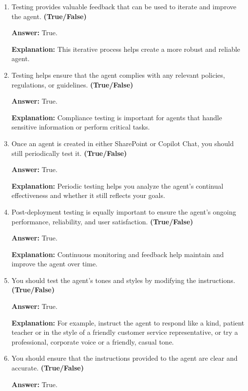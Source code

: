 \documentclass[10pt]{article}
\begin{document}
\begin{enumerate}[leftmargin=*]
\textbf{Explanation:} You can make optimizations to improve the agent's efficiency and effectiveness.

\item Testing provides valuable feedback that can be used to iterate and improve the agent. \textbf{(True/False)}

\textbf{Answer:} True.

\textbf{Explanation:} This iterative process helps create a more robust and reliable agent.

\item Testing helps ensure that the agent complies with any relevant policies, regulations, or guidelines. \textbf{(True/False)}

\textbf{Answer:} True.

\textbf{Explanation:} Compliance testing is important for agents that handle sensitive information or perform critical tasks.

\item Once an agent is created in either SharePoint or Copilot Chat, you should still periodically test it. \textbf{(True/False)}

\textbf{Answer:} True.

\textbf{Explanation:} Periodic testing helps you analyze the agent's continual effectiveness and whether it still reflects your goals.

\item Post-deployment testing is equally important to ensure the agent's ongoing performance, reliability, and user satisfaction. \textbf{(True/False)}

\textbf{Answer:} True.

\textbf{Explanation:} Continuous monitoring and feedback help maintain and improve the agent over time.

\item You should test the agent's tones and styles by modifying the instructions. \textbf{(True/False)}

\textbf{Answer:} True.

\textbf{Explanation:} For example, instruct the agent to respond like a kind, patient teacher or in the style of a friendly customer service representative, or try a professional, corporate voice or a friendly, casual tone.

\item You should ensure that the instructions provided to the agent are clear and accurate. \textbf{(True/False)}

\textbf{Answer:} True.


\end{enumerate}
\end{document}
